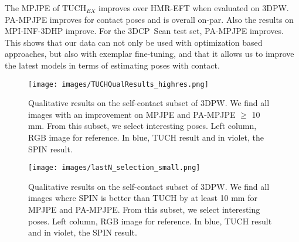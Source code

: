\documentclass[final]{cvpr}
\newcommand{\threedcpscan}{\mbox{3DCP Scan}\xspace}
\theoremstyle{definition}
\begin{document}
The MPJPE of $\text{TUCH}_{\mathit{EX}}$
improves over HMR-EFT when evaluated on 3DPW. PA-MPJPE improves for
contact poses and is overall on-par. Also the results on MPI-INF-3DHP
improve. For the \threedcpscan test set, PA-MPJPE improves. This shows that our 
data can not only be used with optimization based approaches, but also 
with exemplar fine-tuning, and that it allows us to improve the latest models in terms of estimating poses with contact. 	\begin{figure*}[h]
	\begin{center}
		\texttt{[image: images/TUCHQualResults\_highres.png]}
	\end{center}
	\caption{Qualitative results on the self-contact subset of 3DPW. We find all images with an improvement on MPJPE and PA-MPJPE $\geq$ 10 mm. From this subset, we select interesting poses. Left column, RGB image for reference. In blue, TUCH result and in violet, the SPIN result.}
	\label{fig:qual_result_tuch}
\end{figure*}

\begin{figure*}[h]
	\begin{center}
		\texttt{[image: images/lastN\_selection\_small.png]}
	\end{center}
	\caption{Qualitative results on the self-contact subset of 3DPW. We find all images where SPIN is better than TUCH by at least 10 mm for MPJPE and PA-MPJPE. From this subset, we select interesting poses. Left column, RGB image for reference. In blue, TUCH result and in violet, the SPIN result.}
	\label{fig:qual_result_tuch2}
\end{figure*}
 
\end{document}
